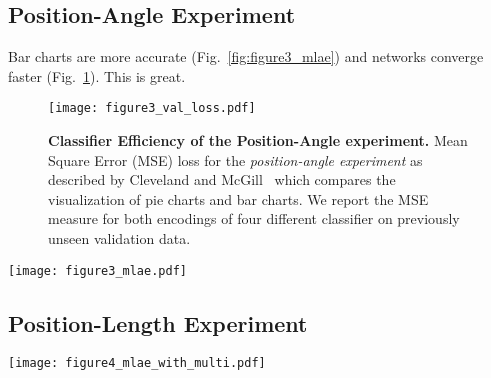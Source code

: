 \subsection{Position-Angle Experiment}

Bar charts are more accurate (Fig.~\ref{fig:figure3_mlae}) and networks converge faster (Fig.~\ref{fig:figure3_val_loss}). This is great.

\begin{figure}[t]
	  \texttt{[image: figure3\_val\_loss.pdf]}
  \caption{\textbf{Classifier Efficiency of the Position-Angle experiment.} Mean Square Error (MSE) loss for the \emph{position-angle experiment} as described by Cleveland and McGill~\cite{cleveland_mcgill} which compares the visualization of pie charts and bar charts. We report the MSE measure for both encodings of four different classifier on previously unseen validation data.}
	\label{fig:figure3_val_loss}
\end{figure}

\begin{figure*}[t]
	  \texttt{[image: figure3\_mlae.pdf]}
  \caption{\textbf{Computational results of the Position-Angle experiment.} Log absolute error means and 95\% confidence intervals for the \emph{position-angle experiment} as described by Cleveland and McGill~\cite{cleveland_mcgill}. We test the performance of a Multi-layer Perceptron (MLP), the LeNet Convolutional Neural Network, as well as feature generation using the VGG19 and Xception networks trained on ImageNet.}
	\label{fig:figure3_mlae}
\end{figure*}

\subsection{Position-Length Experiment}

\begin{figure*}[t]
	  \texttt{[image: figure4\_mlae\_with\_multi.pdf]}
  \caption{\textbf{Computational results of the Position-Length experiment.} Log absolute error means and 95\% confidence intervals for the \emph{position-length experiment} as described by Cleveland and McGill~\cite{cleveland_mcgill}. We test the performance of a Multi-layer Perceptron (MLP), the LeNet Convolutional Neural Network, as well as feature generation using the VGG19 and Xception networks trained on ImageNet.}
	\label{fig:figure4_mlae}
\end{figure*}

